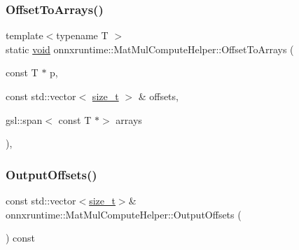\subsubsection{\texorpdfstring{Offset\+To\+Arrays()}{OffsetToArrays()}\hspace{0.1cm}{\footnotesize\ttfamily [2/2]}}
{\footnotesize\ttfamily template$<$typename T $>$ \\
static \mbox{\hyperlink{mlasi_8h_a88f941d423cb2a819b70a1358982b1a6}{void}} onnxruntime\+::\+Mat\+Mul\+Compute\+Helper\+::\+Offset\+To\+Arrays (\begin{DoxyParamCaption}\item[{const T $\ast$}]{p,  }\item[{const std\+::vector$<$ \mbox{\hyperlink{mlasi_8h_a503efbc1c6e50825320ad909366b78ab}{size\+\_\+t}} $>$ \&}]{offsets,  }\item[{gsl\+::span$<$ const T $\ast$$>$}]{arrays }\end{DoxyParamCaption})\hspace{0.3cm}{\ttfamily [inline]}, {\ttfamily [static]}}

\mbox{\label{classonnxruntime_1_1MatMulComputeHelper_a1c7f9ab98b01f7c40c30930821e78523}} 
\subsubsection{\texorpdfstring{Output\+Offsets()}{OutputOffsets()}}
{\footnotesize\ttfamily const std\+::vector$<$\mbox{\hyperlink{mlasi_8h_a503efbc1c6e50825320ad909366b78ab}{size\+\_\+t}}$>$\& onnxruntime\+::\+Mat\+Mul\+Compute\+Helper\+::\+Output\+Offsets (\begin{DoxyParamCaption}{ }\end{DoxyParamCaption}) const\hspace{0.3cm}{\ttfamily [inline]}}

\mbox{\label{classonnxruntime_1_1MatMulComputeHelper_a6cb53d90e64d3f2eb89e652c4fb80e68}} 
